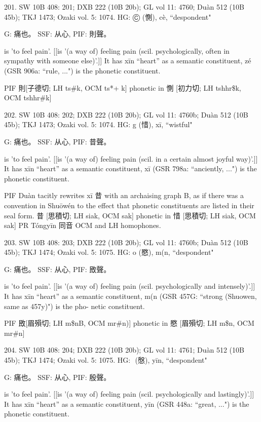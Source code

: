{201. SW 10B 408: 201; DXB 222 (10B 20b); GL vol 11: 4760; Duàn 512 (10B 45b); TKJ 1473; Ozaki vol. 5: 1074.
HG: Ⓒ (惻), cè, ``despondent"

G:	痛也。
SSF: 从心,
PIF: 則聲。

is 'to feel pain'. [[is '(a way of) feeling pain (scil. psychologically, often in sympathy with someone else)'.]]
It has xīn ``heart'' as a semantic constituent,
zé (GSR 906a: ``rule, ...") is the phonetic constituent.

PIF     則[子德切; LH ts\#k, OCM ts*+ k] phonetic in 惻 [初力切; LH tshhr\$k, OCM tshhr\#k]

202. SW 10B 408: 202; DXB 222 (10B 20b); GL vol 11: 4760b; Duàn 512 (10B 45b); TKJ 1473; Ozaki vol. 5: 1074.
HG: g (惜), xī, ``wistful"

G:	痛也。
SSF: 从心,
PIF: 昔聲。

is 'to feel pain'. [[is '(a way of) feeling pain (scil. in a certain almost joyful way)'.]]
It has xīn ``heart'' as a semantic constituent,
xī (GSR 798a: ``anciently, ...") is the phonetic constituent.



PIF     Duàn tacitly rewrites xī 昔 with an archaising graph B, as if there was a convention in
Shuōwén to the effect that phonetic constituents are listed in their seal form.
昔 [思積切; LH siak, OCM sak] phonetic in 惜 [思積切; LH siak, OCM sak]
PR	Tóngyīn 同音 OCM and LH homophones.

203. SW 10B 408: 203; DXB 222 (10B 20b); GL vol 11: 4760b; Duàn 512 (10B 45b); TKJ 1474; Ozaki vol. 5: 1075.
HG:  o (愍), m(n, ``despondent"

G:	痛也。
SSF: 从心,
PIF: 敃聲。

is 'to feel pain'. [[is '(a way of) feeling pain (scil. psychologically and intensely)'.]]
It has xīn ``heart'' as a semantic constituent,
m(n (GSR 457G: ``strong (Shuowen, same as 457y)") is the pho- netic constituent.

PIF     敃[眉殞切; LH m\$nB, OCM mr\#n)] phonetic in 愍 [眉殞切; LH m\$n, OCM mr\#n]

204. SW 10B 408: 204; DXB 222 (10B 20b); GL vol 11: 4761; Duàn 512 (10B 45b); TKJ 1474; Ozaki vol. 5: 1075.
HG:  (慇), yīn, ``despondent"

G:	痛也。
SSF: 从心,
PIF: 殷聲。

is 'to feel pain'. [[is '(a way of) feeling pain (scil. psychologically and lastingly)'.]]
It has xīn ``heart'' as a semantic constituent,
yīn (GSR 448a: ``great, ...") is the phonetic constituent.

}
